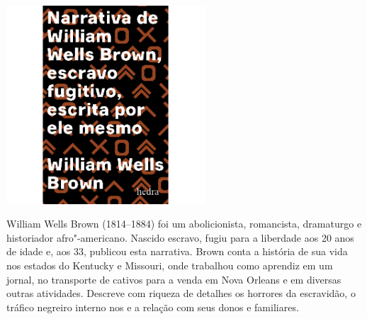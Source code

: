 \vfill

\hspace*{-.4cm}\begin{minipage}[c]{.5\linewidth}
\small{
{}}
\end{minipage}

\pagebreak

\begin{center}
\hspace*{-3.6cm}
\hspace*{3.1cm}\includegraphics[width=74mm]{./grid/brown.jpg}
\end{center}

\hspace*{-7cm}\hrulefill\hspace*{-7cm}

\medskip

\noindent{}William Wells Brown (1814--1884) foi um abolicionista, romancista, dramaturgo e historiador afro"-americano. Nascido escravo, fugiu para a liberdade aos 20 anos de idade e, aos 33, publicou esta narrativa. Brown conta a história de sua vida nos estados do Kentucky e Missouri, onde trabalhou como aprendiz em um jornal, no transporte de cativos para a venda em Nova Orleans e em diversas outras atividades. Descreve com riqueza de detalhes os horrores da escravidão, o tráfico negreiro interno nos  e a relação com seus donos e familiares.

